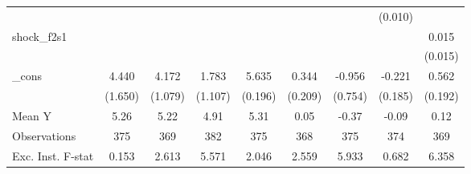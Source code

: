 {\begin{tabular}{l*{8}{c}}
            &                     &                     &                     &                     &                     &                     &     (0.010)         &                     \\
\addlinespace
shock\_f2s1  &                     &                     &                     &                     &                     &                     &                     &       0.015         \\
            &                     &                     &                     &                     &                     &                     &                     &     (0.015)         \\
\addlinespace
\_cons      &       4.440\sym{**} &       4.172\sym{***}&       1.783         &       5.635\sym{***}&       0.344         &      -0.956         &      -0.221         &       0.562\sym{***}\\
            &     (1.650)         &     (1.079)         &     (1.107)         &     (0.196)         &     (0.209)         &     (0.754)         &     (0.185)         &     (0.192)         \\
\midrule
Mean Y      &        5.26         &        5.22         &        4.91         &        5.31         &        0.05         &       -0.37         &       -0.09         &        0.12         \\
Observations&         375         &         369         &         382         &         375         &         368         &         375         &         374         &         369         \\
Exc. Inst. F-stat&       0.153         &       2.613         &       5.571         &       2.046         &       2.559         &       5.933         &       0.682         &       6.358         \\
\bottomrule
\end{tabular}
}

